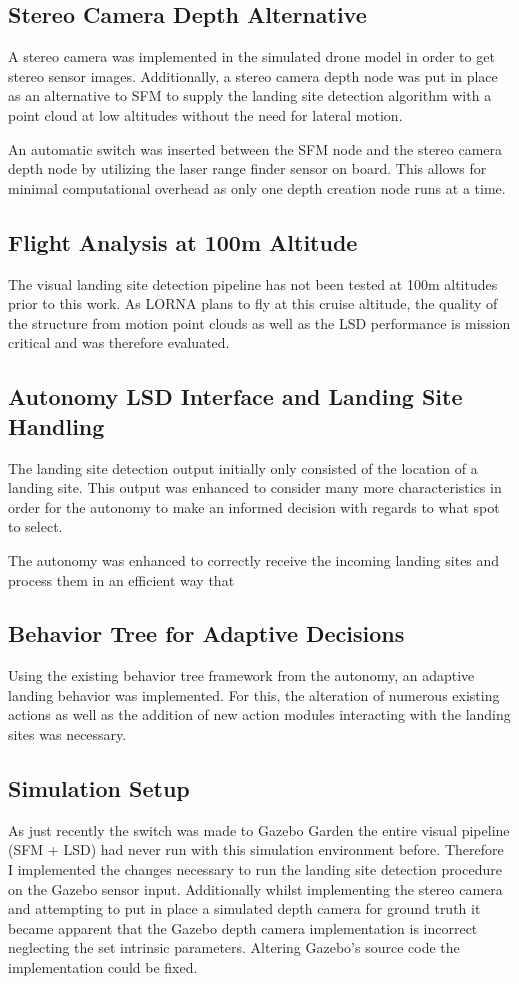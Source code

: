\subsection{Stereo Camera Depth Alternative}
A stereo camera was implemented in the simulated drone model in order to get stereo sensor images. Additionally, a stereo camera depth node was put in place as an alternative to SFM to supply the landing site detection algorithm with a point cloud at low altitudes without the need for lateral motion. 

An automatic switch was inserted between the SFM node and the stereo camera depth node by utilizing the laser range finder sensor on board. This allows for minimal computational overhead as only one depth creation node runs at a time.

\subsection{Flight Analysis at 100m Altitude}
The visual landing site detection pipeline has not been tested at 100m altitudes prior to this work. As LORNA plans to fly at this cruise altitude, the quality of the structure from motion point clouds as well as the LSD performance is mission critical and was therefore evaluated. %
\subsection{Autonomy LSD Interface and Landing Site Handling}
The landing site detection output initially only consisted of the location of a landing site. This output was enhanced to consider many more characteristics in order for the autonomy to make an informed decision with regards to what spot to select.

The autonomy was enhanced to correctly receive the incoming landing sites and process them in an efficient way that
\subsection{Behavior Tree for Adaptive Decisions}

Using the existing behavior tree framework from the autonomy, an adaptive landing behavior was implemented. For this, the alteration of numerous existing actions as well as the addition of new action modules interacting with the landing sites was necessary.
\subsection{Simulation Setup}
As just recently the switch was made to Gazebo Garden the entire visual pipeline (SFM + LSD) had never run with this simulation environment before. Therefore I implemented the changes necessary to run the landing site detection procedure on the Gazebo sensor input. Additionally whilst implementing the stereo camera and attempting to put in place a simulated depth camera for ground truth it became apparent that the Gazebo depth camera implementation is incorrect neglecting the set intrinsic parameters. Altering Gazebo's source code the implementation could be fixed.
